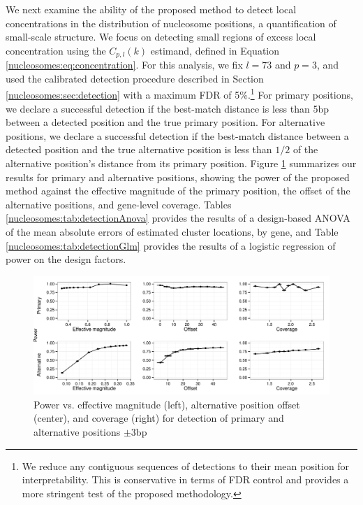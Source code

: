 We next examine the ability of the proposed method to detect local concentrations in the distribution of nucleosome positions, a quantification of small-scale structure.
We focus on detecting small regions of excess local concentration using the $C_{p,l}(k)$ estimand, defined in Equation \ref{nucleosomes:eq:concentration}.
For this analysis, we fix $l = 73$ and $p = 3$, and used the calibrated detection procedure described in Section \ref{nucleosomes:sec:detection} with a maximum FDR of 5\%.\footnote{We reduce any contiguous sequences of detections to their mean position for interpretability. This is conservative in terms of FDR control and provides a more stringent test of the proposed methodology.}
%
For primary positions, we declare a successful detection if the best-match distance is less than 5bp between a detected position and the true primary position.
For alternative positions, we declare a successful detection if the best-match distance between a detected position and the true alternative position is less than $1/2$ of the alternative position's distance from its primary position.
%
Figure \ref{nucleosomes:fig:powerLocal} summarizes our results for primary and alternative positions, showing the power of the proposed method against the effective magnitude of the primary position, the offset of the alternative positions, and gene-level coverage.
Tables \ref{nucleosomes:tab:detectionAnova} provides the results of a design-based ANOVA of the mean absolute errors of  estimated cluster locations, by gene, and Table \ref{nucleosomes:tab:detectionGlm} provides the results of a logistic regression of power on the design factors.
%
\ifx\nofigures\undefined
\begin{figure}
\centering
\includegraphics[width=\textwidth]{figures/nucleosomes/figure_power_combined-pm3_3-panel}
\caption{Power vs. effective magnitude (left), alternative position offset (center), and coverage (right) for detection of primary and alternative positions $\pm 3$bp \label{nucleosomes:fig:powerLocal}}
\end{figure}

